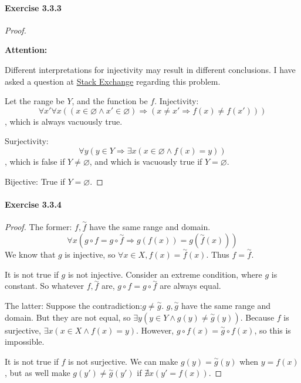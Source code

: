\paragraph{Exercise 3.3.3} \label{exercise3.3.3}
\begin{proof}
\begin{large}
\textbf{Attention:}
\end{large}
Different interpretations for injectivity may result in different conclusions. 
I have asked a question at 
\href{https://math.stackexchange.com/questions/3800240/how-to-interpret-the-definition-of-injectivity}{Stack Exchange} regarding this problem.

Let the range be $Y$, and the function be $f$.
Injectivity:
\[
\forall x'\forall x((x \in \varnothing \wedge x' \in \varnothing) \Longrightarrow
(x \neq x' \Longrightarrow f(x) \neq f(x')))
\], 
which is always vacuously true.

Surjectivity:
\[
\forall y(y \in Y \Longrightarrow \exists x(x \in \varnothing \wedge f(x) = y))
\], 
which is false if $Y \neq \varnothing$, and which is vacuously true if $Y = \varnothing$.

Bijective: True if $Y = \varnothing$.
\end{proof}

\paragraph{Exercise 3.3.4} \label{exercise3.3.4}
\begin{proof}
The former: $f,\overset{\sim}{f}$ have the same range and domain. 
\[
\forall x(g \circ f = g \circ \overset{\sim}{f} \Longrightarrow g(f(x)) = g(\overset{\sim}{f}(x)))
\]
We know that $g$ is injective, so $\forall x \in X, f(x) = \overset{\sim}{f}(x)$. Thus 
$f = \overset{\sim}{f}$.

It is not true if $g$ is not injective. Consider an extreme condition, where $g$ is constant. So 
whatever $f,\overset{\sim}{f}$ are, $g \circ f = g \circ \overset{\sim}{f}$ are always equal.

The latter: Suppose the contradiction:$g \neq \overset{\sim}{g}$.
$g,\overset{\sim}{g}$ have the same range and domain. But they are not equal, so 
$\exists y(y \in Y \wedge g(y) \neq \overset{\sim}{g}(y))$. Because $f$ is surjective, 
$\exists x(x \in X \wedge f(x) = y)$. However, $g \circ f(x) = \overset{\sim}{g} \circ f(x)$, so 
this is impossible.

It is not true if $f$ is not surjective. We can make $g(y) = \overset{\sim}{g}(y)$ when $y=f(x)$, but 
as well make $g(y') \neq \overset{\sim}{g}(y')$ if $\nexists x(y'=f(x))$.
\end{proof}

